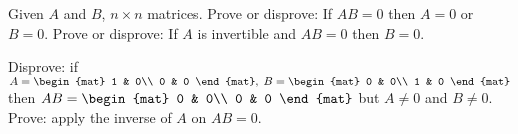 
\begin{Exercise}[
name={},
title={}, 
difficulty=0,
origin={\cite{YL}}]
Given $A$ and $B$, $n\times n$ matrices.
\Question Prove or disprove: If $AB=0$ then $A=0$ or $B=0$.
\Question Prove or disprove: If $A$ is invertible and $AB=0$ then $B=0$.
\end{Exercise}

\begin{Answer}
\Question Disprove: if $A=
\begin{mat} 
1 & 0\\
0 & 0
\end{mat},\;
B=\begin{mat}
0 & 0\\
1 & 0
\end{mat}$ then $AB=\begin{mat}
0 & 0\\
0 & 0
\end{mat}$
but $A\neq 0$ and $B\neq 0$.
\Question Prove: apply the inverse of $A$ on $AB=0$.
\end{Answer}
